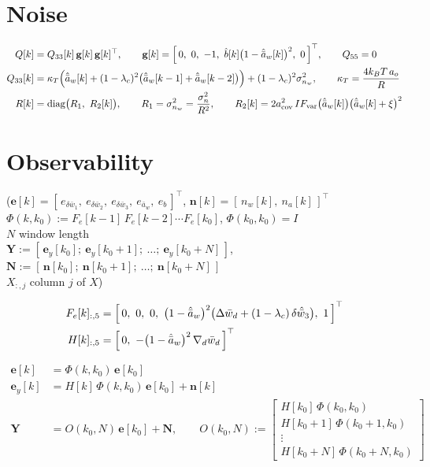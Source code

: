 \documentclass[11pt,a4paper,fontset=none]{ctexart}
\newcommand{\ba}{\bar{a}}
\newcommand{\bw}{\bar{w}}
\newcommand{\ah}{\hat{\ba}_w}
\newcommand{\bh}{\hat{b}}
\begin{document}
\section{Noise}

\begin{align*}
Q[k]    &= Q_{33}[k]\,\mathbf{g}[k]\,\mathbf{g}[k]^{\top}, \qquad
\mathbf{g}[k] = \Bigl[\,0,\ 0,\ -1,\ \bh[k]\bigl(1-\ah[k]\bigr)^{2},\ 0\,\Bigr]^{\top}, \qquad Q_{55} = 0 \\
Q_{33}[k] &= \kappa_T\Bigl(\ah[k] + (1-\lambda_c)^{2}\bigl(\ah[k-1] + \ah[k-2]\bigr)\Bigr) + (1-\lambda_c)^{2}\sigma^{2}_{n_w},
\qquad \kappa_T = \frac{4k_BT\,a_o}{R} \\
R[k]    &= \mathrm{diag}\bigl(R_1,\ R_2[k]\bigr), \qquad R_1 = \sigma^{2}_{n_w} = \frac{\sigma^{2}_{n}}{R^{2}}, \qquad
R_2[k] = 2a_{\mathrm{cov}}^{2}\,IF_{\mathrm{var}}\bigl(\ah[k]\bigr)\bigl(\ah[k] + \xi\bigr)^{2}
\end{align*}

\clearpage
\section{Observability}

($\mathbf{e}[k] = [\,e_{\delta\bw_1},\ e_{\delta\bw_2},\ e_{\delta\bw_3},\ e_{\ba_w},\ e_b\,]^{\top}$,
$\mathbf{n}[k] = [\,n_w[k],\ n_a[k]\,]^{\top}$ \\
$\Phi(k,k_0) := F_e[k-1]\,F_e[k-2]\cdots F_e[k_0]$, $\Phi(k_0,k_0) = I$ \\
$N$ window length \\
$\mathbf{Y} := [\,\mathbf{e}_y[k_0];\ \mathbf{e}_y[k_0+1];\ \dots;\ \mathbf{e}_y[k_0+N]\,]$,
$\mathbf{N} := [\,\mathbf{n}[k_0];\ \mathbf{n}[k_0+1];\ \dots;\ \mathbf{n}[k_0+N]\,]$ \\
$X_{:,j}$ column $j$ of $X$)

\begin{align*}
F_e[k]_{:,5} &= \Bigl[\,0,\ 0,\ 0,\ \bigl(1-\ah\bigr)^{2}\bigl(\Delta\bw_d + (1-\lambda_c)\,\delta\hat{\bw}_3\bigr),\ 1\,\Bigr]^{\top} \\
H[k]_{:,5}   &= \Bigl[\,0,\ -\bigl(1-\ah\bigr)^{2}\,\nabla_d\bw_d\,\Bigr]^{\top}
\end{align*}

\begin{align*}
\mathbf{e}[k]   &= \Phi(k,k_0)\,\mathbf{e}[k_0] \\
\mathbf{e}_y[k] &= H[k]\,\Phi(k,k_0)\,\mathbf{e}[k_0] + \mathbf{n}[k] \\
\mathbf{Y}      &= O(k_0,N)\,\mathbf{e}[k_0] + \mathbf{N}, \qquad
O(k_0,N) := \begin{bmatrix} H[k_0]\,\Phi(k_0,k_0) \\ H[k_0+1]\,\Phi(k_0+1,k_0) \\ \vdots \\ H[k_0+N]\,\Phi(k_0+N,k_0) \end{bmatrix}
\end{align*}
\end{document}
